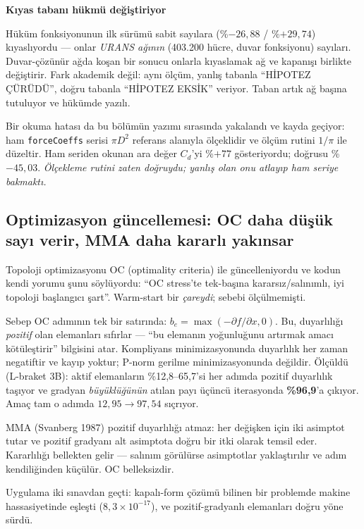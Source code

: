 \documentclass[11pt,a4paper]{article}
\newcommand{\kkkenar}{lacivert}
\newcommand{\kkzemin}{kod}
\newenvironment{renkkutu}[3]{%
  \renewcommand{\kkkenar}{#1}\renewcommand{\kkzemin}{#2}%
  \par\medskip\noindent
  \begin{lrbox}{\kutugovde}%
  \begin{minipage}{\dimexpr\linewidth-2\fboxsep-2\fboxrule\relax}\footnotesize
  \textcolor{#1}{\textbf{#3}}\par\vspace{3pt}%
}{%
  \end{minipage}%
  \end{lrbox}%
  \noindent\fcolorbox{\kkkenar}{\kkzemin}{\usebox{\kutugovde}}%
  \par\medskip
}
\newenvironment{dikkat}[1]{\begin{renkkutu}{orta}{ortabg}{#1}}{\end{renkkutu}}
\begin{document}
\begin{dikkat}{Kıyas tabanı hükmü değiştiriyor}
Hüküm fonksiyonunun ilk sürümü sabit sayılara (\%$-26{,}88$ / \%$+29{,}74$)
kıyaslıyordu --- onlar \emph{URANS ağının} (403.200 hücre, duvar fonksiyonu)
sayıları. Duvar-çözünür ağda koşan bir sonucu onlarla kıyaslamak ağ ve kapanışı
birlikte değiştirir. Fark akademik değil: aynı ölçüm, yanlış tabanla
``HİPOTEZ ÇÜRÜDÜ'', doğru tabanla ``HİPOTEZ EKSİK'' veriyor. Taban artık ağ
başına tutuluyor ve hükümde yazılı.

Bir okuma hatası da bu bölümün yazımı sırasında yakalandı ve kayda geçiyor:
ham \texttt{forceCoeffs} serisi $\pi D^2$ referans alanıyla ölçeklidir ve
ölçüm rutini $1/\pi$ ile düzeltir. Ham seriden okunan ara değer $C_d$'yi
\%$+77$ gösteriyordu; doğrusu \%$-45{,}03$. \emph{Ölçekleme rutini zaten
doğruydu; yanlış olan onu atlayıp ham seriye bakmaktı.}
\end{dikkat}

\subsection{Optimizasyon güncellemesi: OC daha düşük sayı verir, MMA daha kararlı yakınsar}
\label{sub:mma-uretim}
\label{sub:mma}

Topoloji optimizasyonu OC (optimality criteria) ile güncelleniyordu ve kodun
kendi yorumu şunu söylüyordu: ``OC stress'te tek-başına kararsız/salınımlı, iyi
topoloji başlangıcı şart''. Warm-start bir \emph{çareydi}; sebebi ölçülmemişti.

Sebep OC adımının tek bir satırında: $b_e = \max(-\partial f/\partial x, 0)$.
Bu, duyarlılığı \emph{pozitif} olan elemanları sıfırlar --- ``bu elemanın
yoğunluğunu artırmak amacı kötüleştirir'' bilgisini atar. Kompliyans
minimizasyonunda duyarlılık her zaman negatiftir ve kayıp yoktur; P-norm
gerilme minimizasyonunda değildir. Ölçüldü (L-braket 3B): aktif elemanların
\%12{,}8--65{,}7'si her adımda pozitif duyarlılık taşıyor ve gradyan
\emph{büyüklüğünün} atılan payı üçüncü iterasyonda \textbf{\%96{,}9}'a çıkıyor.
Amaç tam o adımda $12{,}95 \rightarrow 97{,}54$ sıçrıyor.

MMA (Svanberg 1987) pozitif duyarlılığı atmaz: her değişken için iki asimptot
tutar ve pozitif gradyanı alt asimptota doğru bir itki olarak temsil eder.
Kararlılığı bellekten gelir --- salınım görülürse asimptotlar yaklaştırılır ve
adım kendiliğinden küçülür. OC belleksizdir.

Uygulama iki sınavdan geçti: kapalı-form çözümü bilinen bir problemde makine
hassasiyetinde eşleşti ($8{,}3\times10^{-17}$), ve pozitif-gradyanlı
elemanları doğru yöne sürdü.
\end{document}
